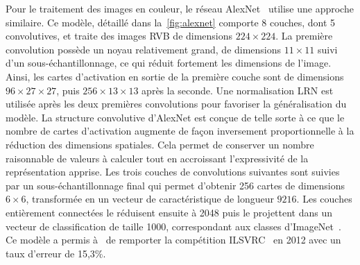 Pour le traitement des images en couleur, le réseau AlexNet~\cite{krizhevsky_imagenet_2012} utilise une approche similaire. Ce modèle, détaillé dans la~\cref{fig:alexnet} comporte 8 couches, dont 5 convolutives, et traite des images \gls{RVB} de dimensions $224\times224$. La première convolution possède un noyau relativement grand, de dimensions $11\times11$ suivi d'un sous-échantillonnage, ce qui réduit fortement les dimensions de l'image. Ainsi, les cartes d'activation en sortie de la première couche sont de dimensions $96\times27\times27$, puis $256\times13\times13$ après la seconde. Une normalisation \gls{LRN} est utilisée après les deux premières convolutions pour favoriser la généralisation du modèle. La structure convolutive d'AlexNet est conçue de telle sorte à ce que le nombre de cartes d'activation augmente de façon inversement proportionnelle à la réduction des dimensions spatiales. Cela permet de conserver un nombre raisonnable de valeurs à calculer tout en accroissant l'expressivité de la représentation apprise. Les trois couches de convolutions suivantes sont suivies par un sous-échantillonnage final qui permet d'obtenir 256 cartes de dimensions $6\times6$, transformée en un vecteur de caractéristique de longueur $9216$. Les couches entièrement connectées le réduisent ensuite à 2048 puis le projettent dans un vecteur de classification de taille 1000, correspondant aux classes d'ImageNet~\cite{deng_imagenet_2009}. Ce modèle a permis à~\citet{krizhevsky_imagenet_2012} de remporter la compétition \gls{ILSVRC}~\cite{russakovsky_imagenet_2015} en 2012 avec un taux d'erreur de 15,3\%.

